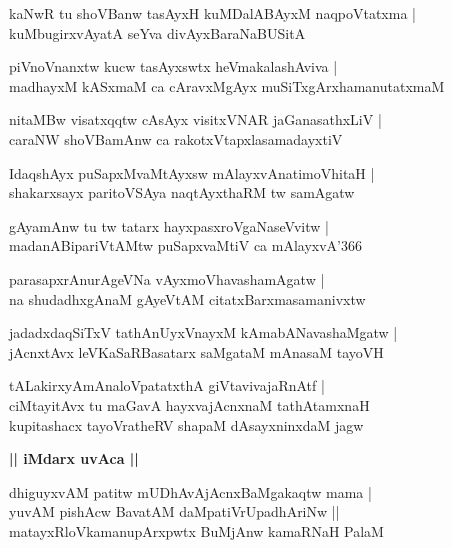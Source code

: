 \documentclass[twoside,12pt,openright]{book}
\newcounter{shloka}[chapter]
\def\uvaca#1{\centerline{{\large\textbf{#1}}}}
\begin{document}
\begin{shloka}%
kaNwR tu shoVBanw tasAyxH kuMDalABAyxM naqpoVtatxma |\\
kuMbugirxvAyatA seYva divAyxBaraNaBUSitA 
\end{shloka}

\begin{shloka}%
piVnoVnanxtw kucw tasAyxswtx heVmakalashAviva |\\
madhayxM kASxmaM ca cAravxMgAyx muSiTxgArxhamanutatxmaM
\end{shloka}

\begin{shloka}%
nitaMBw visatxqqtw cAsAyx visitxVNAR jaGanasathxLiV |\\
caraNW shoVBamAnw ca rakotxVtapxlasamadayxtiV 
\end{shloka}

\begin{shloka}%
IdaqshAyx puSapxMvaMtAyxsw mAlayxvAnatimoVhitaH |\\
shakarxsayx paritoVSAya naqtAyxthaRM tw samAgatw
\end{shloka}

\begin{shloka}%
gAyamAnw tu tw tatarx hayxpasxroVgaNaseVvitw |\\
madanABipariVtAMtw puSapxvaMtiV ca mAlayxvA\char'366
\end{shloka}

\begin{shloka}%
parasapxrAnurAgeVNa vAyxmoVhavashamAgatw |\\
na shudadhxgAnaM gAyeVtAM citatxBarxmasamanivxtw 
\end{shloka}

\begin{shloka}%
jadadxdaqSiTxV tathAnUyxVnayxM kAmabANavashaMgatw |\\
jAcnxtAvx leVKaSaRBasatarx saMgataM mAnasaM tayoVH
\end{shloka}

\begin{shloka}%
tALakirxyAmAnaloVpatatxthA giVtavivajaRnAtf |\\
ciMtayitAvx tu maGavA hayxvajAcnxnaM tathAtamxnaH \\
kupitashacx tayoVratheRV shapaM dAsayxninxdaM jagw
\end{shloka}

\uvaca{|| iMdarx uvAca ||}

\begin{shloka}%
dhiguyxvAM patitw mUDhAvAjAcnxBaMgakaqtw mama |\\
yuvAM pishAcw BavatAM daMpatiVrUpadhAriNw ||\\
matayxRloVkamanupArxpwtx BuMjAnw kamaRNaH PalaM
\end{shloka}
\end{document}
